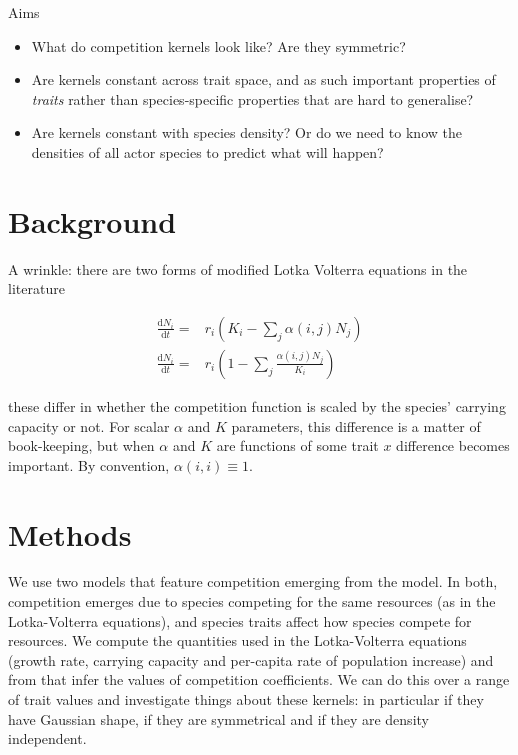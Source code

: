 \documentclass[a4paper,11pt]{article}
\newcommand{\ud}{\ensuremath{\mathrm{d}}}
\begin{document}
Aims

\begin{itemize}
\item What do competition kernels look like?  Are they symmetric?
\item Are kernels constant across trait space, and as such important
  properties of \emph{traits} rather than species-specific properties
  that are hard to generalise?
\item Are kernels constant with species density?  Or do we need to
  know the densities of all actor species to predict what will happen?
\end{itemize}

\section{Background}

A wrinkle: there are two forms of modified Lotka Volterra equations in
the literature

\begin{subequations}
  \label{eq:LV}
  \begin{align}
    \frac{\ud N_i}{\ud t} =& r_i\left(K_i  - \sum_j\alpha(i, j) N_j\right)\\
    \frac{\ud N_i}{\ud t} =&
    r_i\left(1 - \sum_j \frac{\alpha(i, j) N_j}{K_i}\right)
  \end{align}
\end{subequations}

these differ in whether the competition function is scaled by the
species' carrying capacity or not.  For scalar $\alpha$ and $K$
parameters, this difference is a matter of book-keeping, but when
$\alpha$ and $K$ are functions of some trait $x$ difference becomes
important.  By convention, $\alpha(i, i) \equiv 1$.

\section{Methods}

%
We use two models that feature competition emerging from the model.
In both, competition emerges due to species competing for the same
resources (as in the Lotka-Volterra equations), and species traits
affect how species compete for resources.  We compute the quantities
used in the Lotka-Volterra equations (growth rate, carrying capacity
and per-capita rate of population increase) and from that infer the
values of competition coefficients.
We can do this over a range of trait values and investigate things
about these kernels: in particular if they have Gaussian shape, if
they are symmetrical and if they are density independent.
\end{document}
